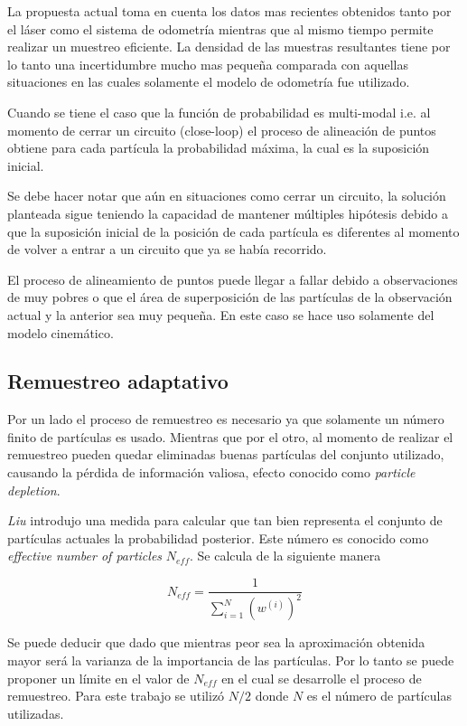 \documentclass[10pt,a4paper]{article}
\begin{document}
La propuesta actual toma en cuenta los datos mas recientes obtenidos tanto por el láser como el sistema de odometría mientras que al mismo tiempo permite realizar un muestreo eficiente. La densidad de las muestras resultantes tiene por lo tanto una incertidumbre mucho mas pequeña comparada con aquellas situaciones en las cuales solamente el modelo de odometría fue utilizado.

Cuando se tiene el caso que la función de probabilidad es multi-modal i.e. al momento de cerrar un circuito (close-loop) el proceso de alineación de puntos obtiene para cada partícula la probabilidad máxima, la cual es la suposición inicial.

Se debe hacer notar que aún en situaciones como cerrar un circuito, la solución planteada sigue teniendo la capacidad de mantener múltiples hipótesis debido a que la suposición inicial de la posición de cada partícula es diferentes al momento de volver a entrar a un circuito que ya se había recorrido.

El proceso de alineamiento de puntos puede llegar a fallar debido a observaciones de muy pobres o que el área de superposición de las partículas de la observación actual y la anterior sea muy pequeña. En este caso se hace uso solamente del modelo cinemático.

\subsection{Remuestreo adaptativo}

Por un lado el proceso de remuestreo es necesario ya que solamente un número finito de partículas es usado. Mientras que por el otro, al momento de realizar el remuestreo pueden quedar eliminadas buenas partículas del conjunto utilizado, causando la pérdida de información valiosa, efecto conocido como \emph{particle depletion}.

\emph{Liu} introdujo una medida para calcular que tan bien representa el conjunto de partículas actuales la probabilidad posterior. Este número es conocido como \emph{effective number of particles} $ N_{eff} $. Se calcula de la siguiente manera

\begin{equation}
	N_{eff}	= \frac{1}
		{\sum^{N}_{i=1} (w^{(i)})^{2}}
\end{equation}

Se puede deducir que dado que mientras peor sea la aproximación obtenida mayor será la varianza de la importancia de las partículas. Por lo tanto se puede proponer un límite en el valor de $N_{eff}$ en el cual se desarrolle el proceso de remuestreo. Para este trabajo se utilizó $ N/2 $ donde $ N $ es el número de partículas utilizadas.
\end{document}

